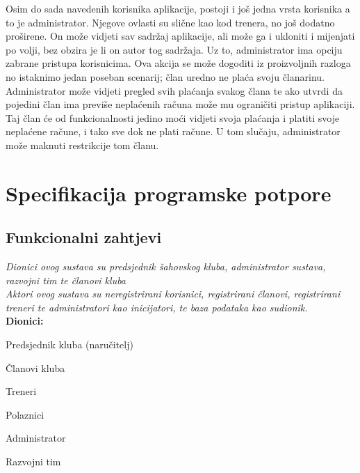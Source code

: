 \documentclass{article}
\begin{document}
		
		Osim do sada navedenih korisnika aplikacije, postoji i još jedna vrsta korisnika a to je administrator. Njegove ovlasti su slične kao kod trenera, no još dodatno proširene. On može vidjeti sav sadržaj aplikacije, ali može ga i ukloniti i mijenjati po volji, bez obzira je li on autor tog sadržaja. Uz to, administrator ima opciju zabrane pristupa korisnicima. Ova akcija se može dogoditi iz proizvoljnih razloga no istaknimo jedan poseban scenarij; član uredno ne plaća svoju članarinu. Administrator može vidjeti pregled svih plaćanja svakog člana te ako utvrdi da pojedini član ima previše neplaćenih računa može mu ograničiti pristup aplikaciji. Taj član će od funkcionalnosti jedino moći vidjeti svoja plaćanja i platiti svoje neplaćene račune, i tako sve dok ne plati račune. U tom slučaju, administrator može maknuti restrikcije tom članu.
		\eject 
		
	\section{Specifikacija programske potpore}
		\subsection{Funkcionalni zahtjevi}
		\textit{Dionici ovog sustava su predsjednik šahovskog kluba, administrator sustava, razvojni tim te članovi kluba}\\
		
		\noindent \textit{Aktori ovog sustava su neregistrirani korisnici, registrirani članovi, registrirani treneri te administratori kao inicijatori, te baza podataka kao sudionik. }\\
		
		\noindent \textbf{Dionici:}
		
		\begin{packed_enum}
			
			\item Predsjednik kluba (naručitelj) 
			\item Članovi kluba 
			\begin{packed_enum}
				\item Treneri
				\item Polaznici
			\end{packed_enum}
			\item Administrator 
			\item Razvojni tim 
			
		\end{packed_enum}
	
\end{document}
